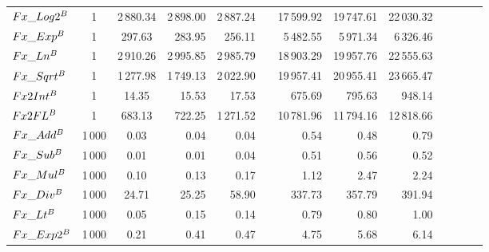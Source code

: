 \begin{table}
{\begin{tabular}{ l c c r r r r r r r r r r}
            $Fx\_Log2^{B}$                         & 1       & 2\,880.34               & 2\,898.00  & 2\,887.24               &  & 17\,599.92  & 19\,747.61  & 22\,030.32  \\
            $Fx\_Exp^{B}$                          & 1       & 297.63                  & 283.95     & 256.11                  &  & 5\,482.55   & 5\,971.34   & 6\,326.46   \\
            $Fx\_Ln^{B}$                           & 1       & 2\,910.26               & 2\,995.85  & 2\,985.79               &  & 18\,903.29  & 19\,957.76  & 22\,555.63  \\
            $Fx\_Sqrt^{B}$                         & 1       & 1\,277.98               & 1\,749.13  & 2\,022.90               &  & 19\,957.41  & 20\,955.41  & 23\,665.47  \\
            $Fx2Int^{B}$                           & 1       & 14.35                   & 15.53      & 17.53                   &  & 675.69      & 795.63      & 948.14      \\
            $Fx2FL^{B}$                            & 1       & 683.13                  & 722.25     & 1\,271.52               &  & 10\,781.96  & 11\,794.16  & 12\,818.66  \\
            \midrule
            $Fx\_Add^{B}$                          & 1\,000  & 0.03                    & 0.04       & 0.04                    &  & 0.54        & 0.48        & 0.79        \\
            $Fx\_Sub^{B}$                          & 1\,000  & 0.01                    & 0.01       & 0.04                    &  & 0.51        & 0.56        & 0.52        \\
            $Fx\_Mul^{B}$                          & 1\,000  & 0.10                    & 0.13       & 0.17                    &  & 1.12        & 2.47        & 2.24        \\
            $Fx\_Div^{B}$                          & 1\,000  & 24.71                   & 25.25      & 58.90                   &  & 337.73      & 357.79      & 391.94      \\
            $Fx\_Lt^{B}$                           & 1\,000  & 0.05                    & 0.15       & 0.14                    &  & 0.79        & 0.80        & 1.00        \\
            $Fx\_Exp2^{B}$                         & 1\,000  & 0.21                    & 0.41       & 0.47                    &  & 4.75        & 5.68        & 6.14        \\

\end{tabular}}
\end{table}

